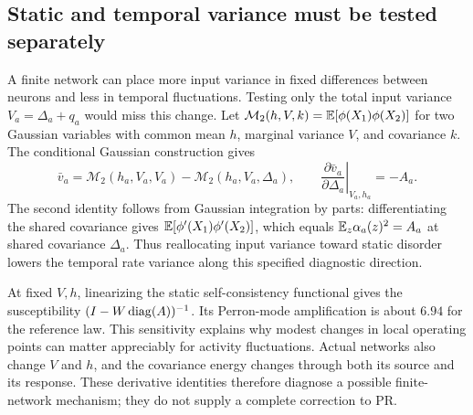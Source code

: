 \subsection{Static and temporal variance must be tested separately}

A finite network can place more input variance in fixed differences between
neurons and less in temporal fluctuations. Testing only the total input
variance $V_a=\Delta_a+q_a$ would miss this change. Let
$\mathcal M_2(h,V,k)=\mathbb E[\phi(X_1)\phi(X_2)]$ for two Gaussian variables
with common mean $h$, marginal variance $V$, and covariance $k$. The
conditional Gaussian construction gives
\begin{equation}
 \bar v_a=\mathcal M_2(h_a,V_a,V_a)
          -\mathcal M_2(h_a,V_a,\Delta_a),\qquad
 \left.\frac{\partial\bar v_a}{\partial\Delta_a}\right|_{V_a,h_a}
 =-A_a.
 \label{eq:partitionderivative}
\end{equation}
The second identity follows from Gaussian integration by parts: differentiating
the shared covariance gives $\mathbb E[\phi'(X_1)\phi'(X_2)]$, which equals
$\mathbb E_z\alpha_a(z)^2=A_a$ at shared covariance $\Delta_a$.
Thus reallocating input variance toward static disorder lowers the temporal
rate variance along this specified diagnostic direction.

At fixed $V,h$, linearizing the static self-consistency functional gives the
susceptibility $(I-W\operatorname{diag}(A))^{-1}$. Its Perron-mode amplification is about
$6.94$ for the reference law. This sensitivity explains why modest changes
in local operating points can matter appreciably for activity fluctuations.
Actual networks also change $V$ and $h$, and the covariance energy changes
through both its source and its response. These derivative identities
therefore diagnose a possible finite-network mechanism; they do not supply
a complete correction to PR.
